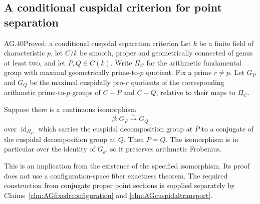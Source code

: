 \subsection{A conditional cuspidal criterion for point separation}

\begin{claim}{AG.40}{Proved: a conditional cuspidal separation criterion}
\label{clm:AGcuspidalcriterion}
Let \(k\) be a finite field of characteristic \(p\), let
\(C/k\) be smooth, proper and geometrically connected of
genus at least two, and let \(P,Q\in C(k)\).
Write \(\Pi_C\) for the arithmetic fundamental group with
maximal geometrically prime-to-\(p\) quotient. Fix a prime
\(r\ne p\). Let \(G_P\) and \(G_Q\) be the maximal
cuspidally pro-\(r\) quotients of the corresponding
arithmetic prime-to-\(p\) groups of \(C-P\) and \(C-Q\),
relative to their maps to \(\Pi_C\).

Suppose there is a continuous isomorphism
\[
                  \beta:G_P\xrightarrow{\sim}G_Q
\]
over \(\operatorname{id}_{\Pi_C}\) which carries the
cuspidal decomposition group at \(P\) to a conjugate of
the cuspidal decomposition group at \(Q\). Then \(P=Q\).
The isomorphism is in particular over the identity of
\(G_k\), so it preserves arithmetic Frobenius.
\end{claim}

This is an implication from the existence of the specified
isomorphism. Its proof does not use a configuration-space
fiber exactness theorem. The required construction from
conjugate proper point sections is supplied separately by
Claims~\ref{clm:AGfixedrconfiguration} and
\ref{clm:AGcuspidaltransport}.

